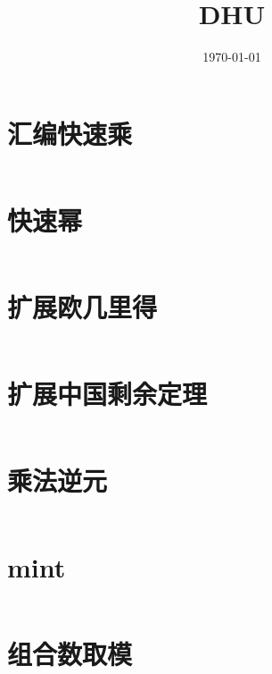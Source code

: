 \documentclass[titlepage,landscape,a4paper,10pt]{article}
\title{\Large{DHU}}
\date{\today}
\begin{document}
\maketitle

\begin{multicols*}{2}

\begin{spacing}{0}
	\tableofcontents
\end{spacing}
\end{multicols*}

\begin{multicols}{2}

\newpage


\begin{spacing}{0.8}
\section{汇编快速乘}
\inputminted{cpp}{/Users/Corn/Desktop/Code/ACM_SCL/code/mul_mod.cpp}

\section{快速幂}
\inputminted{cpp}{/Users/Corn/Desktop/Code/ACM_SCL/code/pow_mod.cpp}

\section{扩展欧几里得}
\inputminted{cpp}{/Users/Corn/Desktop/Code/ACM_SCL/code/ext_gcd.cpp}

\section{扩展中国剩余定理}
\inputminted{cpp}{/Users/Corn/Desktop/Code/ACM_SCL/code/ext_crt.cpp}

\section{乘法逆元}
\inputminted{cpp}{/Users/Corn/Desktop/Code/ACM_SCL/code/Inv.cpp}

\section{mint}
\inputminted{cpp}{/Users/Corn/Desktop/Code/ACM_SCL/code/ModInt.cpp}

\section{组合数取模}
\inputminted{cpp}{/Users/Corn/Desktop/Code/ACM_SCL/code/nCm.cpp}


\end{spacing}
\end{multicols}
\end{document}
